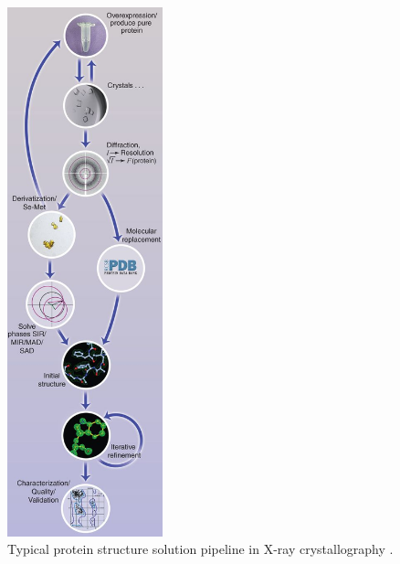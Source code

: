     \begin{figure}
        \centering
        \includegraphics[width=0.4\textwidth]{figures/introduction/crystallography_pipeline.jpg}
        \caption{Typical protein structure solution pipeline in X-ray crystallography \cite{garman2014}.}
        \label{fig:Crystallography-pipeline}
    \end{figure}

